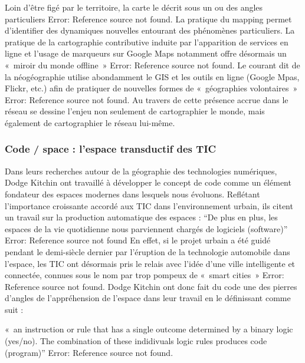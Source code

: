 Loin d’être figé par le territoire, la carte le décrit sous un ou des angles particuliers Error: Reference source not found. La pratique du mapping permet d’identifier des dynamiques nouvelles entourant des phénomènes particuliers. La pratique de la cartographie contributive induite par l’apparition de services en ligne et l’usage de marqueurs sur Google Maps notamment offre désormais un « miroir du monde offline » Error: Reference source not found. Le courant dit de la néogéographie utilise abondamment le GIS et les outils en ligne (Google Mpas, Flickr, etc.) afin de pratiquer de nouvelles formes de « géographies volontaires » Error: Reference source not found. Au travers de cette présence accrue dans le réseau se dessine l’enjeu non seulement de cartographier le monde, mais également de cartographier le réseau lui-même. 


\subsubsection[Code / space : l’espace transductif des TIC]{Code / space : l’espace transductif des TIC}
Dans leurs recherches autour de la géographie des technologies numériques, Dodge  Kitchin ont travaillé à développer le concept de code comme un élément fondateur des espaces modernes dans lesquels nous évoluons. Reflétant l’importance croissante accordé aux TIC dans l’environnement urbain, ils citent un travail sur la production automatique des espaces : “De plus en plus, les espaces de la vie  quotidienne nous parviennent chargés de logiciels (software)” Error: Reference source not found En effet, si le projet urbain a été guidé pendant le demi-siècle dernier par l’éruption de la technologie automobile dans l’espace, les TIC ont désormais pris le relais avec l’idée d’une ville intelligente et connectée, connues sous le nom par trop pompeux de « smart cities » Error: Reference source not found. Dodge  Kitchin ont donc fait du code une des pierres d’angles de l’appréhension de l’espace dans leur travail en le définissant comme suit : 

« an instruction or rule that has a single outcome determined by a binary logic 	(yes/no). The combination of these indidivuals logic rules produces code 		(program)” Error: Reference source not found.

